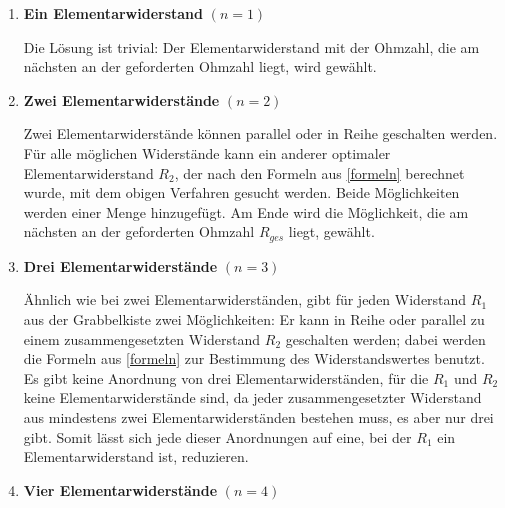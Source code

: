 \documentclass[a4paper,10pt,ngerman]{scrartcl}
\begin{document}
\begin{enumerate}
  \item \textbf{Ein Elementarwiderstand} $(n=1)$
  
  Die Lösung ist trivial: Der Elementarwiderstand mit der Ohmzahl, die am nächsten an der geforderten Ohmzahl liegt, wird gewählt.
  \item \textbf{Zwei Elementarwiderstände} $(n=2)$
  
  Zwei Elementarwiderstände können parallel oder in Reihe geschalten werden. Für alle möglichen Widerstände kann ein anderer optimaler Elementarwiderstand $R_2$, der nach den Formeln aus \ref{formeln} berechnet wurde, mit dem obigen Verfahren gesucht werden. Beide Möglichkeiten werden einer Menge hinzugefügt. Am Ende wird die Möglichkeit, die am nächsten an der geforderten Ohmzahl $R_{ges}$ liegt, gewählt.

  \item \textbf{Drei Elementarwiderstände} $(n=3)$
  
  Ähnlich wie bei zwei Elementarwiderständen, gibt für jeden Widerstand $R_1$ aus der Grabbelkiste zwei Möglichkeiten: Er kann in Reihe oder parallel zu einem zusammengesetzten Widerstand $R_2$ geschalten werden; dabei werden die Formeln aus \ref{formeln} zur Bestimmung des Widerstandswertes benutzt. Es gibt keine Anordnung von drei Elementarwiderständen, für die $R_1$ und $R_2$ keine Elementarwiderstände sind, da jeder zusammengesetzter Widerstand aus mindestens zwei Elementarwiderständen bestehen muss, es aber nur drei gibt. Somit lässt sich jede dieser Anordnungen auf eine, bei der $R_1$ ein Elementarwiderstand ist, reduzieren.

  \item \textbf{Vier Elementarwiderstände} $(n=4)$
  

\end{enumerate}
\end{document}
